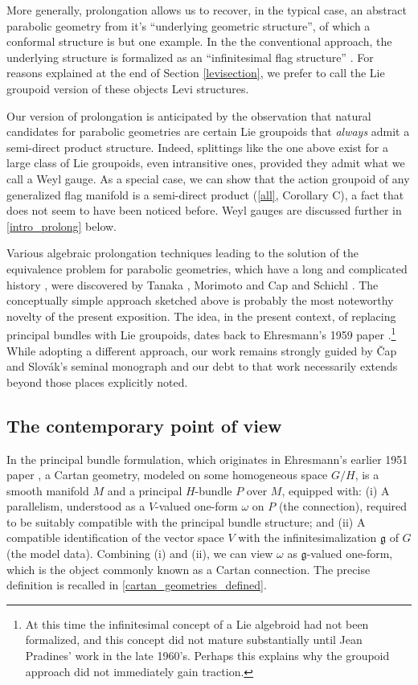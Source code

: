 \documentclass[leqno,12pt]{amsart} %
\begin{document}
More generally, prolongation allows us to recover, in the typical case, an abstract
parabolic geometry from it's ``underlying geometric structure'', of which a conformal
structure is but one example. In the the conventional approach, the underlying structure
is formalized as an ``infinitesimal flag structure'' \cite[Definition 3.1.6,
p.~248]{Cap_Slovak_09}. For reasons explained at the end of Section \ref{levisection}, we
prefer to call the Lie groupoid version of these objects {\df Levi structures}.

Our version of prolongation is anticipated by the observation that natural candidates for
parabolic geometries are certain Lie groupoids that {\em always} admit a semi-direct
product structure. Indeed, splittings like the one above exist for a large class of Lie
groupoids, even intransitive ones, provided they admit what we call a Weyl gauge. As
a special case, we can show that the action groupoid of any generalized flag manifold is a
semi-direct product (\ref{all}, Corollary C), a fact that does not seem to have
been noticed before. Weyl gauges are discussed further in \ref{intro_prolong} below.

Various algebraic prolongation techniques leading to the solution of the equivalence
problem for parabolic geometries, which have a long and complicated history \cite[Appendix
A]{Cap_Slovak_09}, were discovered by Tanaka \cite{Tanaka_79}, Morimoto \cite{Morimoto_93}
and Cap and Schichl \cite{Cap_Schichl_00}. The conceptually simple approach sketched above
is probably the most noteworthy novelty of the present exposition. The idea, in the
present context, of replacing principal bundles with Lie groupoids, dates back to
Ehresmann's 1959 paper \cite{Ehresmann_59}.\footnote{At this time the infinitesimal
  concept of a Lie algebroid had not been formalized, and this concept did not mature
  substantially until Jean Pradines' work in the late 1960's. Perhaps this explains why
  the groupoid approach did not immediately gain traction.}  While adopting a different
approach, our work remains strongly guided by {\v{C}}ap and Slov{\'a}k's seminal monograph
\cite{Cap_Slovak_09} and our debt to that work necessarily extends beyond those places
explicitly noted.

\subsection{The contemporary point of view}\label{contemporary}%
In the principal bundle formulation, which originates in Ehresmann's earlier 1951 paper
\cite{Ehresmann_51}, a Cartan geometry, modeled on some homogeneous space $G/H$, is
a smooth manifold $M$ and a principal $H$-bundle $P$ over $M$, equipped with: (i) A
parallelism, understood as a $V$-valued one-form $\omega$ on $P$ (the {\df connection}),
required to be suitably compatible with the principal bundle structure; and (ii) A
compatible identification of the vector space $V$ with the infinitesimalization
${\mathfrak g}$ of $G$ (the {\df model data}). Combining (i) and (ii), we can view
$\omega $ as ${\mathfrak g} $-valued one-form, which is the object commonly known as a
{\df Cartan connection}. The precise definition is recalled in
\ref{cartan_geometries_defined}.
\end{document}
